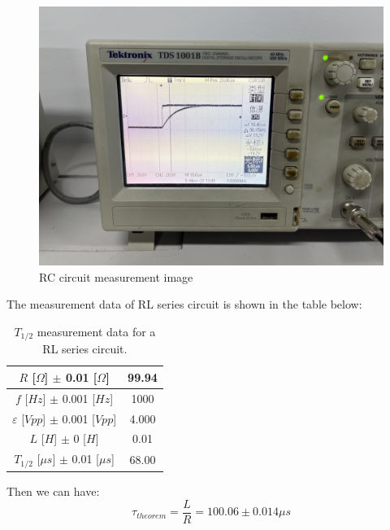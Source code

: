 \documentclass[12pt, a4paper]{article}
\begin{document}
\begin{figure}[H]
	\centering
	\includegraphics[scale=0.06]{IMG_1829.JPG}
	\caption{RC circuit measurement image}
\end{figure}

The measurement data of RL series circuit is shown in the table below:
\begin{table}[H]
	\begin{center}
	\begin{tabular}{|c|c|}
	\hline
	$R$ [$\Omega$] $\pm$ 0.01 [$\Omega$]	&	99.94	\\
	\hline
	$f$ [$Hz$] $\pm$ 0.001 [$Hz$]	&	1000	\\
	\hline
	$\varepsilon$ [$Vpp$] $\pm$ 0.001 [$Vpp$]	&	4.000	\\
	\hline
	$L$ [$H$] $\pm$ 0 [$H$]	&	0.01	\\
	\hline
	$T_{1/2}$ [$\mu s$] $\pm$ 0.01 [$\mu s$]	&	68.00	\\
	\hline
	\end{tabular}
	\caption{$T_{1/2}$ measurement data for a RL series circuit.}
	\label{tab-2}
	\end{center}
\end{table}
Then we can have:
$$\tau_{theorem} = \frac{L}{R} = 100.06\pm0.014\mu s$$
\end{document}
